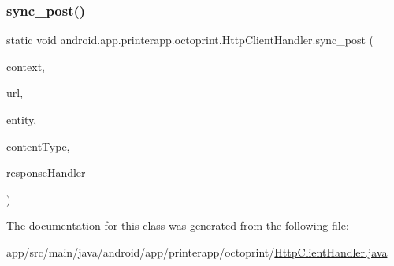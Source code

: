 \subsubsection{\texorpdfstring{sync\+\_\+post()}{sync\_post()}}
{\footnotesize\ttfamily static void android.\+app.\+printerapp.\+octoprint.\+Http\+Client\+Handler.\+sync\+\_\+post (\begin{DoxyParamCaption}\item[{Context}]{context,  }\item[{String}]{url,  }\item[{Http\+Entity}]{entity,  }\item[{String}]{content\+Type,  }\item[{Response\+Handler\+Interface}]{response\+Handler }\end{DoxyParamCaption})\hspace{0.3cm}{\ttfamily [static]}}



The documentation for this class was generated from the following file\+:\begin{DoxyCompactItemize}
\item 
app/src/main/java/android/app/printerapp/octoprint/\hyperlink{_http_client_handler_8java}{Http\+Client\+Handler.\+java}\end{DoxyCompactItemize}
